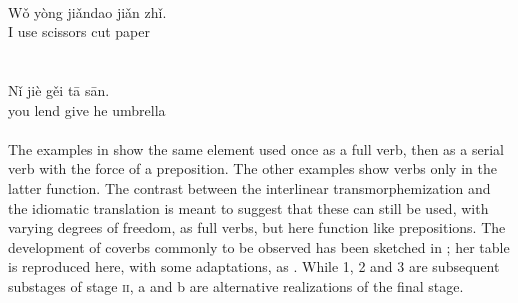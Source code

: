 \noindent \ea\label{ex:E88}
\langinfo{\LangMand}{}{}\\
\gll   W\v{o}  yòng  ji\v{a}ndao  ji\v{a}n  zh\v{i}.\\
 I  use  scissors  cut  paper\\
\\
\z
\noindent \ea\label{ex:E89}
\langinfo{\LangMand}{}{}\\
\gll  N\v{i}  jiè  g\v{e}i  t\=a  s\=an.\\
 you  lend  give  he  umbrella\\
\\
\z
\noindent The examples in  show the same element used once as a full verb, then as a serial verb with the force of a preposition. The other examples show verbs only in the latter function. The contrast between the interlinear transmorphemization and the idiomatic translation is meant to suggest that these can still be used, with varying degrees of freedom, as full verbs, but here function like prepositions. The development of coverbs commonly to be observed has been sketched in \citet[3]{Clark1979}; her table is reproduced here, with some adaptations, as . While 1, 2 and 3 are subsequent substages of stage \textsc{ii}, a and b are alternative realizations of the final stage.

